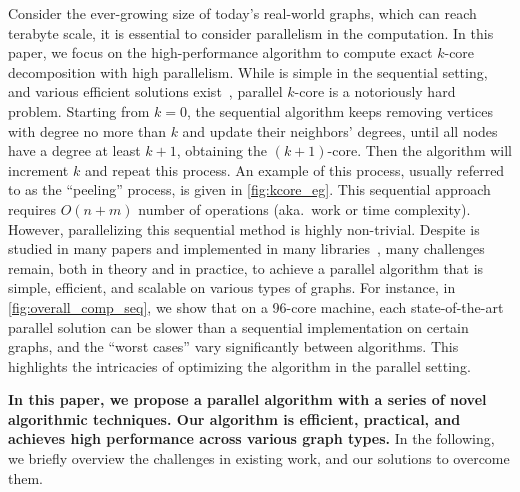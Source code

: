 Consider the ever-growing size of today's real-world graphs, 
which can reach terabyte scale,
it is essential to consider parallelism in the \kcore{} computation. 
In this paper, we focus on the high-performance algorithm to compute exact $k$-core decomposition with high parallelism.
While \kcore{} is simple in the sequential setting, and various efficient solutions exist~\cite{seidman1983network,batagelj2003m}, 
parallel $k$-core is a notoriously hard problem. 
Starting from $k=0$, the sequential algorithm keeps removing vertices with degree no more than $k$ and update their neighbors' degrees, until all nodes have a degree at least $k+1$, obtaining the $(k+1)$-core. Then the algorithm will increment $k$ and repeat this process. 
An example of this process, usually referred to as the ``peeling'' process, is given in \cref{fig:kcore_eg}.
This sequential approach requires $O(n+m)$ number of operations (aka.\ work or time complexity). 
However, parallelizing this sequential method is highly non-trivial.
Despite \kcore{} is studied in many papers and implemented in many libraries~\cite{gonzalez2014graphx,gonzalez2012powergraph,shun2013ligra,dhulipala2017,kabir2017parallel, cheng2011efficient,montresor2011distributed, li2021k,dasari2014park, esfandiari2018parallel, liu2024parallel, mehrafsa2020vectorising,tripathy2018scalable,zhao2024speedcore, ahmad2023accelerating, konduri2022implementation, khaouid2015k,zhang2017accelerating, zhao2024pico, wen2018efficient}, 
many challenges remain, both in theory and in practice, to achieve a parallel \kcore{} algorithm that is simple, efficient, and scalable on various types of graphs.  
For instance, in \cref{fig:overall_comp_seq}, we show that on a 96-core machine, each state-of-the-art parallel \kcore solution can be slower than a sequential implementation on certain graphs, and the ``worst cases'' vary significantly between algorithms. 
This highlights the intricacies of optimizing the \kcore{} algorithm in the parallel setting. 

\textbf{In this paper, we propose a parallel \kcore{} algorithm with a series of novel algorithmic techniques. 
Our algorithm is efficient, practical, and achieves high performance across various graph types.}
In the following, we briefly overview the challenges in existing work, and our solutions to overcome them. 

